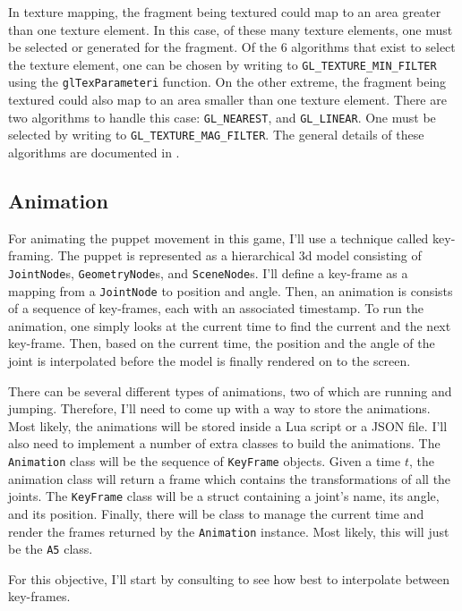 \documentclass[11pt]{article}
\begin{document}
In texture mapping, the fragment being textured could map to an area greater than one texture element. In this case, of these many texture elements, one must be selected or generated for the fragment. Of the 6 algorithms that exist to select the texture element, one can be chosen by writing to \verb|GL_TEXTURE_MIN_FILTER| using the \verb|glTexParameteri| function. On the other extreme, the fragment being textured could also map to an area smaller than one texture element. There are two algorithms to handle this case: \verb|GL_NEAREST|, and \verb|GL_LINEAR|. One must be selected by writing to \verb|GL_TEXTURE_MAG_FILTER|. The general details of these algorithms are documented in \cite{gl-tex-parameter}.

\subsection*{Animation}
For animating the puppet movement in this game, I'll use a technique called key-framing. The puppet is represented as a hierarchical 3d model consisting of \verb|JointNode|s, \verb|GeometryNode|s, and \verb|SceneNode|s. I'll define a key-frame as a mapping from a \verb|JointNode| to position and angle. Then, an animation is consists of a sequence of key-frames, each with an associated timestamp. To run the animation, one simply looks at the current time to find the current and the next key-frame. Then, based on the current time, the position and the angle of the joint is interpolated before the model is finally rendered on to the screen.

There can be several different types of animations, two of which are running and jumping. Therefore, I'll need to come up with a way to store the animations. Most likely, the animations will be stored inside a Lua script or a JSON file. I'll also need to implement a number of extra classes to build the animations. The \verb|Animation| class will be the sequence of \verb|KeyFrame| objects. Given a time $t$, the animation class will return a frame which contains the transformations of all the joints. The \verb|KeyFrame| class will be a struct containing a joint's name, its angle, and its position. Finally, there will be class to manage the current time and render the frames returned by the \verb|Animation| instance. Most likely, this will just be the \verb|A5| class.

For this objective, I'll start by consulting \cite{interactive-computer-graphics} to see how best to interpolate between key-frames.
\end{document}
